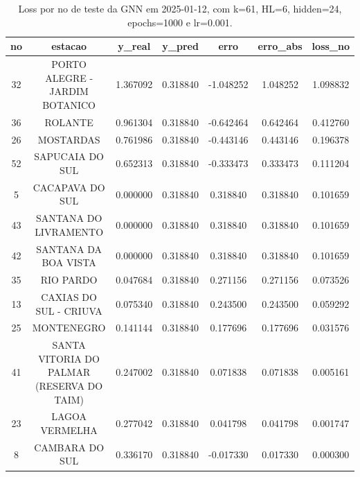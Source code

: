 \begin{table}[h]
\centering
\caption{Loss por no de teste da GNN em 2025-01-12, com k=61, HL=6, hidden=24, epochs=1000 e lr=0.001.}
\label{tab:gnn_loss_k61_hl6_h24_e1000_d20250112}
\begin{tabular}{ccccccc}
\toprule
no & estacao & y\_real & y\_pred & erro & erro\_abs & loss\_no \\
\midrule
32 & PORTO ALEGRE - JARDIM BOTANICO & 1.367092 & 0.318840 & -1.048252 & 1.048252 & 1.098832 \\
36 & ROLANTE & 0.961304 & 0.318840 & -0.642464 & 0.642464 & 0.412760 \\
26 & MOSTARDAS & 0.761986 & 0.318840 & -0.443146 & 0.443146 & 0.196378 \\
52 & SAPUCAIA DO SUL & 0.652313 & 0.318840 & -0.333473 & 0.333473 & 0.111204 \\
5 & CACAPAVA DO SUL & 0.000000 & 0.318840 & 0.318840 & 0.318840 & 0.101659 \\
43 & SANTANA DO LIVRAMENTO & 0.000000 & 0.318840 & 0.318840 & 0.318840 & 0.101659 \\
42 & SANTANA DA BOA VISTA & 0.000000 & 0.318840 & 0.318840 & 0.318840 & 0.101659 \\
35 & RIO PARDO & 0.047684 & 0.318840 & 0.271156 & 0.271156 & 0.073526 \\
13 & CAXIAS DO SUL - CRIUVA & 0.075340 & 0.318840 & 0.243500 & 0.243500 & 0.059292 \\
25 & MONTENEGRO & 0.141144 & 0.318840 & 0.177696 & 0.177696 & 0.031576 \\
41 & SANTA VITORIA DO PALMAR (RESERVA DO TAIM) & 0.247002 & 0.318840 & 0.071838 & 0.071838 & 0.005161 \\
23 & LAGOA VERMELHA & 0.277042 & 0.318840 & 0.041798 & 0.041798 & 0.001747 \\
8 & CAMBARA DO SUL & 0.336170 & 0.318840 & -0.017330 & 0.017330 & 0.000300 \\
\bottomrule
\end{tabular}
\end{table}
